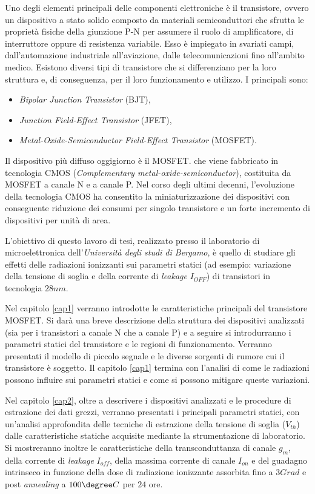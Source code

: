 Uno degli elementi principali delle componenti elettroniche è il transistore, ovvero un dispositivo a stato solido composto da materiali semiconduttori che sfrutta le proprietà fisiche della giunzione P-N per assumere il ruolo di amplificatore, di interruttore oppure di resistenza variabile.
Esso è impiegato in svariati campi, dall'automazione industriale all'aviazione, dalle telecomunicazioni fino all'ambito medico.
Esistono diversi tipi di transistore che si differenziano per la loro struttura e, di conseguenza, per il loro funzionamento e utilizzo. I principali sono:
\begin{itemize}
    \item \textit{Bipolar Junction Transistor} (BJT),
    \item \textit{Junction Field-Effect Transistor} (JFET),
    \item \textit{Metal-Oxide-Semiconductor Field-Effect Transistor} (MOSFET).
\end{itemize}
Il dispositivo più diffuso oggigiorno è il MOSFET. che viene fabbricato in tecnologia CMOS (\textit{Complementary metal-oxide-semiconductor}), costituita da MOSFET a canale N e a canale P. Nel corso degli ultimi decenni, l'evoluzione della tecnologia CMOS ha consentito la miniaturizzazione dei dispositivi con conseguente riduzione dei consumi per singolo transistore e un forte incremento di dispositivi per unità di area.

\vspace*{0.5cm}

L'obiettivo di questo lavoro di tesi, realizzato presso il laboratorio di microelettronica dell'\textit{Università degli studi di Bergamo}, è quello di studiare gli effetti delle radiazioni ionizzanti sui parametri statici (ad esempio: variazione della tensione di soglia e della corrente di \emph{leakage} $I_{OFF}$) di transistori in tecnologia $28nm$. 

\vspace*{0.5cm}

Nel capitolo \ref{cap1} verranno introdotte le caratteristiche principali del transistore MOSFET.
Si darà una breve descrizione della struttura dei dispositivi analizzati (sia per i transistori a canale N che a canale P) e a seguire si introdurranno i parametri statici del transistore e le regioni di funzionamento. Verranno presentati il modello di piccolo segnale e le diverse sorgenti di rumore cui il transistore è soggetto. Il capitolo \ref{cap1} termina con l'analisi di come le radiazioni possono influire sui parametri statici e come si possono mitigare queste variazioni.

Nel capitolo \ref{cap2}, oltre a descrivere i dispositivi analizzati e le procedure di estrazione dei dati grezzi, verranno presentati i principali parametri statici, con un'analisi approfondita delle tecniche di estrazione della tensione di soglia ($V_{th}$) dalle caratteristiche statiche acquisite mediante la strumentazione di laboratorio. Si mostreranno inoltre le caratteristiche della transconduttanza di canale $g_m$, della corrente di \emph{leakage} $I_{off}$, della massima corrente di canale $I_{on}$ e del guadagno intrinseco in funzione della dose di radiazione ionizzante assorbita fino a $3 Grad$ e post \emph{annealing} a $100\degree C$ per $24$ ore.
